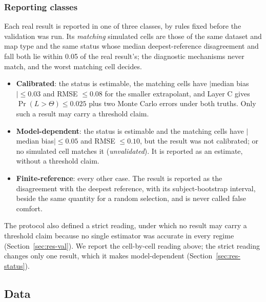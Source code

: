 \documentclass[11pt]{article}
\begin{document}
\subsubsection{Reporting classes}\label{sec:classes}
Each real result is reported in one of three classes, by rules fixed before the validation was run.
Its \emph{matching} simulated cells are those of the same dataset and map type and the same status whose median deepest-reference disagreement and fall both lie within 0.05 of the real result's; the diagnostic mechanisms never match, and the worst matching cell decides.
\begin{itemize}[leftmargin=*]
  \item \textbf{Calibrated}: the status is estimable, the matching cells have $|$median bias$|\le0.03$ and RMSE $\le0.08$ for the smaller extrapolant, and Layer C gives $\Pr(L>\Theta)\le0.025$ plus two Monte Carlo errors under both truths.
  Only such a result may carry a threshold claim.
  \item \textbf{Model-dependent}: the status is estimable and the matching cells have $|$median bias$|\le0.05$ and RMSE $\le0.10$, but the result was not calibrated; or no simulated cell matches it (\emph{unvalidated}).
  It is reported as an estimate, without a threshold claim.
  \item \textbf{Finite-reference}: every other case.
  The result is reported as the disagreement with the deepest reference, with its subject-bootstrap interval, beside the same quantity for a random selection, and is never called false comfort.
\end{itemize}
The protocol also defined a strict reading, under which no result may carry a threshold claim because no single estimator was accurate in every regime (Section~\ref{sec:res-val}).
We report the cell-by-cell reading above; the strict reading changes only one result, which it makes model-dependent (Section~\ref{sec:res-status}).

\subsection{Data}\label{sec:data}
\end{document}
